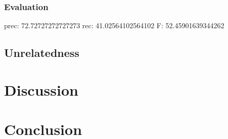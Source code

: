 \documentclass[a4paper,10pt]{scrartcl}
\theoremstyle{style}
\begin{document}
\subsubsection{Evaluation}

prec: 72.72727272727273
rec: 41.02564102564102
F: 52.45901639344262

\subsection{Unrelatedness} %


\section{Discussion}

\section{Conclusion} %

\newpage


\end{document}
